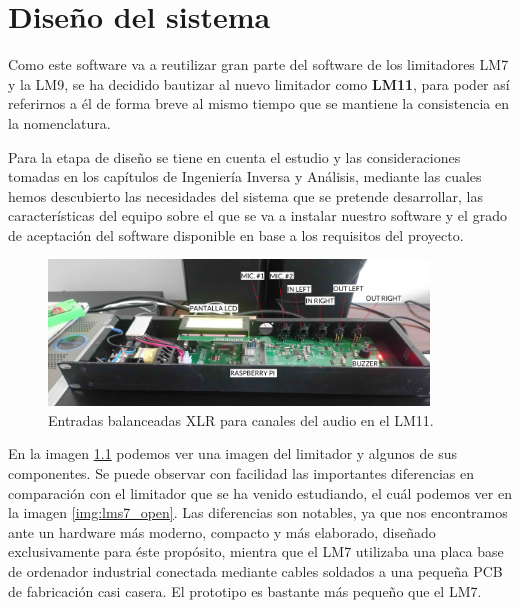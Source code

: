 \chapter{Diseño del sistema}   \label{cap:capitulo5}

Como este software va a reutilizar gran parte del software de los limitadores \acrshort{LM7} y la \acrshort{LM9}, se ha decidido bautizar al nuevo limitador como \textbf{LM11}, para poder así referirnos a él de forma breve al mismo tiempo que se mantiene la consistencia en la nomenclatura.

Para la etapa de diseño se tiene en cuenta el estudio y las consideraciones tomadas en los capítulos de Ingeniería Inversa y Análisis, mediante las cuales hemos descubierto las necesidades del sistema que se pretende desarrollar, las características del equipo sobre el que se va a instalar nuestro software y el grado de aceptación del software disponible en base a los requisitos del proyecto.

\begin{figure}[h]
    \centering
    \includegraphics[width=0.9\textwidth]{imagenes/lm7-fotos/lms11-frontal.jpg}
    \caption{Entradas balanceadas \acrshort{XLR} para canales del audio en el \acrshort{LM11}.}
    \label{img:lms11-xlr}
\end{figure}

En la imagen \ref{img:lms11-xlr} podemos ver una imagen del limitador y algunos de sus componentes. Se puede observar con facilidad las importantes diferencias en comparación con el limitador que se ha venido estudiando, el cuál podemos ver en la imagen \ref{img:lms7_open}. Las diferencias son notables, ya que nos encontramos ante un hardware más moderno, compacto y más elaborado, diseñado exclusivamente para éste propósito, mientra que el \acrshort{LM7} utilizaba una placa base de ordenador industrial conectada mediante cables soldados a una pequeña \acrshort{PCB} de fabricación casi casera. El prototipo es bastante más pequeño que el \acrshort{LM7}.

